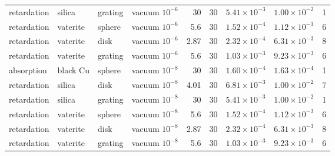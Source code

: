 \begin{tabular}{|l|l|l|l|r|r|r|r|r|}
retardation & silica & grating & vacuum $10^{-6}$ & 30 & 30 & $5.41\times10^{-3}$ & $1.00\times10^{-2}$ & 1 \\
retardation & vaterite & sphere & vacuum $10^{-6}$ & 5.6 & 30 & $1.52\times10^{-4}$ & $1.12\times10^{-3}$ & 6 \\
retardation & vaterite & disk & vacuum $10^{-6}$ & 2.87 & 30 & $2.32\times10^{-4}$ & $6.31\times10^{-3}$ & 8 \\
retardation & vaterite & grating & vacuum $10^{-6}$ & 5.6 & 30 & $1.03\times10^{-3}$ & $9.23\times10^{-3}$ & 6 \\
absorption & black Cu & sphere & vacuum $10^{-8}$ & 30 & 30 & $1.60\times10^{-4}$ & $1.63\times10^{-4}$ & 1 \\
retardation & silica & disk & vacuum $10^{-8}$ & 4.01 & 30 & $6.81\times10^{-3}$ & $1.00\times10^{-2}$ & 7 \\
retardation & silica & grating & vacuum $10^{-8}$ & 30 & 30 & $5.41\times10^{-3}$ & $1.00\times10^{-2}$ & 1 \\
retardation & vaterite & sphere & vacuum $10^{-8}$ & 5.6 & 30 & $1.52\times10^{-4}$ & $1.12\times10^{-3}$ & 6 \\
retardation & vaterite & disk & vacuum $10^{-8}$ & 2.87 & 30 & $2.32\times10^{-4}$ & $6.31\times10^{-3}$ & 8 \\
retardation & vaterite & grating & vacuum $10^{-8}$ & 5.6 & 30 & $1.03\times10^{-3}$ & $9.23\times10^{-3}$ & 6 \\
\hline
\end{tabular}

